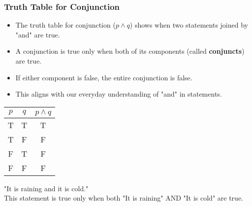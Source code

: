 \documentclass{beamer}
\begin{document}
                \begin{frame}
                    \frametitle{Truth Table for Conjunction}
                    \begin{itemize}
                        \item The truth table for conjunction ($p \wedge q$) shows when two statements joined by "and" are true.
                        \item A conjunction is true only when both of its components (called \textbf{conjuncts}) are true.
                        \item If either component is false, the entire conjunction is false.
                        \item This aligns with our everyday understanding of "and" in statements.
                    \end{itemize}
                    
                    \begin{center}
                        \scriptsize
                    \begin{tabular}{|c|c|c|}
                    \hline
                    $p$ & $q$ & $p \wedge q$ \\
                    \hline
                    T & T & T \\
                    \hline
                    T & F & F \\
                    \hline
                    F & T & F \\
                    \hline
                    F & F & F \\
                    \hline
                    \end{tabular}
                    \end{center}
                    
                    \begin{example}
                    "It is raining and it is cold."\\
                    This statement is true only when both "It is raining" AND "It is cold" are true.
                    \end{example}
                    \end{frame}
                    
\end{document}
